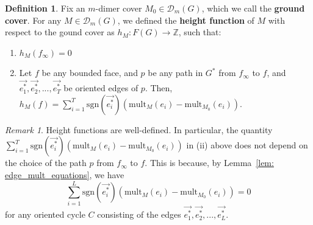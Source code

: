 \documentclass[11pt]{amsart}
\theoremstyle{definition}
\newtheorem{defn}[thm]{Definition}
\theoremstyle{remark}
\newtheorem{rem}[thm]{Remark}
\numberwithin{equation}{section}
\begin{document}
\begin{defn}
    Fix an $m$-dimer cover $M_0\in \mathcal{D}_{m}(G)$, which we call the \textbf{ground cover}. For any $M\in \mathcal{D}_{m}(G)$, we defined the \textbf{height function} of $M$ with respect to the gound cover as $h_M: F(G)\rightarrow \mathbb{Z}$, such that:
    \begin{enumerate}
        \item[(i)] $h_M(f_\infty) = 0$
        \item[(ii)] Let $f$ be any bounded face, and $p$ be any path in $G^*$ from $f_{\infty}$ to $f$, and $\Vec{e_1^*},\Vec{e_2^*},...,\Vec{e_T^*}$ be oriented edges of $p$. Then, $h_M(f) = \sum^T_{i=1}\text{sgn}(\Vec{e_i^*})(\text{mult}
        _M(e_i)-\text{mult}
        _{M_0}(e_i))$. 
    \end{enumerate}
\end{defn}
\begin{rem}
    Height functions are well-defined. In particular, the quantity $\sum^T_{i=1}\text{sgn}(\Vec{e_i^*})(\text{mult}
        _M(e_i)-\text{mult}
        _{M_0}(e_i))$ in (ii) above does not depend on the choice of the path $p$ from $f_\infty$ to $f$. This is because, by Lemma~\ref{lem: edge_mult_equations}, we have $$\sum^L_{i=1}\text{sgn}(\Vec{e_i^*})(\text{mult}
        _M(e_i)-\text{mult}
        _{M_0}(e_i)) = 0$$ for any oriented cycle $C$ consisting of the edges $\Vec{e_1^*},\Vec{e_2^*},...,\Vec{e_L^*}$.
\end{rem}
\end{document}
